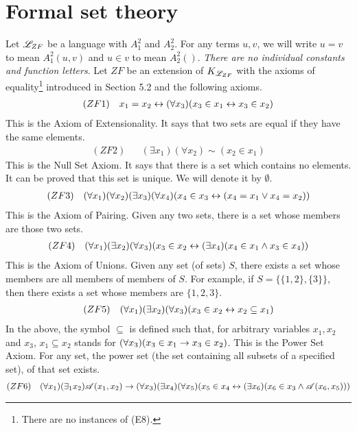 \section{Formal set theory}

Let \(\mathscr{L}_{ZF}\) be a language with \(A^2_1\) and \(A^2_2\). For any terms \(u, v\), we will write \(u = v\) to mean \(A^2_1(u, v)\) and \(u \in v\) to mean \(A^2_2()\). \textit{There are no individual constants and function letters}. Let \(ZF\) be an extension of \(K_{\mathscr{L}_{ZF}}\) with the axioms of equality\footnote{There are no instances of (E8).} introduced in Section 5.2 and the following axioms.
\begin{align*}
  (ZF1)&&
  x_1 = x_2 \leftrightarrow (\forall x_3)(x_3 \in x_1 \leftrightarrow x_3 \in x_2)
\end{align*}
This is the Axiom of Extensionality. It says that two sets are equal if they have the same elements.
\begin{align*}
  (ZF2)&&
  (\exists x_1)(\forall x_2)\sim(x_2 \in x_1)
\end{align*}
This is the Null Set Axiom. It says that there is a set which contains no elements. It can be proved that this set is unique. We will denote it by \(\emptyset\).
\begin{align*}
  (ZF3)&&
  (\forall x_1)(\forall x_2)(\exists x_3)(\forall x_4)(x_4 \in x_3 \leftrightarrow (x_4 = x_1 \lor x_4 = x_2))
\end{align*}
This is the Axiom of Pairing. Given any two sets, there is a set whose members are those two sets.
\begin{align*}
  (ZF4)&&
  (\forall x_1)(\exists x_2)(\forall x_3)(x_3 \in x_2 \leftrightarrow (\exists x_4)(x_4 \in x_1 \land x_3 \in x_4))
\end{align*}
This is the Axiom of Unions. Given any set (of sets) \(S\), there exists a set whose members are all members of members of \(S\). For example, if \(S = \{\{1, 2\}, \{3\}\}\), then there exists a set whose members are \(\{1, 2, 3\}\).
\begin{align*}
  (ZF5)&&
  (\forall x_1)(\exists x_2)(\forall x_3)(x_3 \in x_2 \leftrightarrow x_2 \subseteq x_1)
\end{align*}
In the above, the symbol \(\subseteq\) is defined such that, for arbitrary variables \(x_1, x_2\) and \(x_3\), \(x_1 \subseteq x_2\) stands for \((\forall x_3)(x_3 \in x_1 \rightarrow x_3 \in x_2)\). This is the Power Set Axiom. For any set, the power set (the set containing all subsets of a specified set), of that set exists.
\begin{align*}
  (ZF6)&&
  (\forall x_1)(\exists_1 x_2)\mathscr{A}(x_1, x_2) \rightarrow (\forall x_3)(\exists x_4)(\forall x_5)(x_5 \in x_4 \leftrightarrow (\exists x_6)(x_6 \in x_3 \land \mathscr{A}(x_6, x_5)))
\end{align*}
